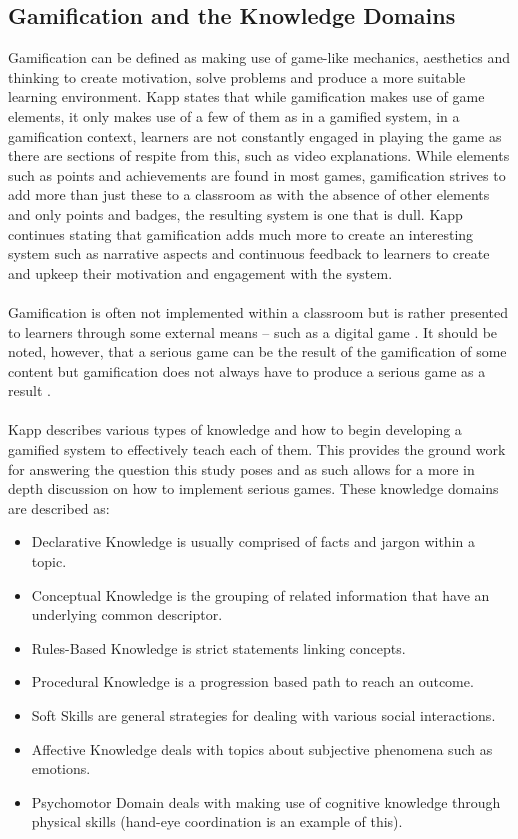 \documentclass[conference]{IEEEtran}
\begin{document}
\subsection{Gamification and the Knowledge Domains}
Gamification can be defined as making use of game-like mechanics, aesthetics and thinking to create motivation, solve problems and produce a more suitable learning environment\cite{Kapp2012a}. Kapp\cite{KappArticle2012} states that while gamification makes use of game elements, it only makes use of a few of them as in a gamified system, in a gamification context, learners are not constantly engaged in playing the game as there are sections of respite from this, such as video explanations. While elements such as points and achievements are found in most games, gamification strives to add more than just these to a classroom as with the absence of other elements and only points and badges, the resulting system is one that is dull\cite{KappArticle2012}. Kapp\cite{KappArticle2012} continues stating that gamification adds much more to create an interesting system such as narrative aspects and continuous feedback to learners to create and upkeep their motivation and engagement with the system.
\\\\
Gamification is often not implemented within a classroom but is rather presented to learners through some external means – such as a digital game \cite{KappArticle2012}. It should be noted, however, that a serious game can be the result of the gamification of some content but gamification does not always have to produce a serious game as a result \cite{KappArticle2012}.  
\\\\
Kapp\cite{Kapp2012a} describes various types of knowledge and how to begin developing a gamified system to effectively teach each of them. This provides the ground work for answering the question this study poses and as such allows for a more in depth discussion on how to implement serious games. These knowledge domains are described as\cite{Kapp2012a}:

\begin{itemize}
\item Declarative Knowledge is usually comprised of facts and jargon within a topic.
\item Conceptual Knowledge is the grouping of related information that have an underlying common descriptor.
\item Rules-Based Knowledge is strict statements linking concepts.
\item Procedural Knowledge is a progression based path to reach an outcome.
\item Soft Skills are general strategies for dealing with various social interactions.
\item Affective Knowledge deals with topics about subjective phenomena such as emotions.
\item Psychomotor Domain deals with making use of cognitive knowledge through physical skills (hand-eye coordination is an example of this).
\end{itemize}
\end{document}
